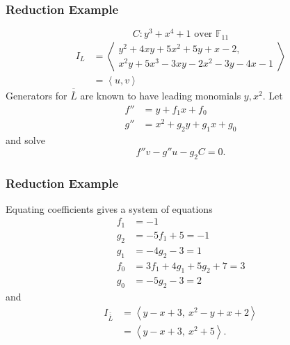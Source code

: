 \documentclass{beamer}
\newcommand{\pid}[1]{\left\langle #1 \right\rangle}
\newcommand{\bb}[1]{\mathbb{#1}}
\renewcommand{\bar}{\overline}
\newcommand{\backupend}{
   \addtocounter{framenumbervorappendix}{-\value{framenumber}}
   \addtocounter{framenumber}{\value{framenumbervorappendix}}
}
\begin{document}

\begin{frame}
\frametitle{Reduction Example}
  \[ C : y^3 + x^4 + 1 \text{ over $\bb F_{11}$}\]
  \begin{align*}
    I_L &= \pid{ \begin{array}{l} 
          y^2 + 4xy + 5x^2 + 5y + x - 2,\\
          x^2y + 5x^3 - 3xy - 2x^2 - 3y - 4x - 1
          \end{array} } \\
        &= \pid{u, v}
  \end{align*}
  Generators for $\bar{\bar L}$ are known to have leading monomials $y, x^2$. Let
  \begin{align*}
    f'' &= y + f_1x + f_0 \\
    g'' &= x^2 + g_2y + g_1x + g_0
  \end{align*}
  and solve
  \[ f''v - g''u - g_2C = 0. \]
\end{frame}


\begin{frame}
\frametitle{Reduction Example}
  Equating coefficients gives a system of equations
  \begin{align*}
    f_1 &= - 1 \\
    g_2 &= - 5f_1 + 5 = - 1 \\
    g_1 &= - 4g_2 - 3 = 1 \\
    f_0 &= 3f_1 + 4g_1 + 5g_2 + 7 = 3 \\
    g_0 &= - 5g_2 - 3 = 2
  \end{align*}
  and
  \begin{align*}
    I_{\bar{\bar L}}
      &= \pid{y - x + 3, ~x^2 - y + x + 2} \\
      &= \pid{y - x + 3, ~x^2 + 5}.
  \end{align*}
\end{frame}


\backupend
\end{document}

